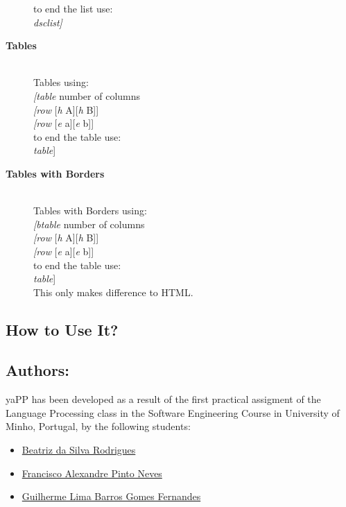 \documentclass{article}
\begin{document}
\begin{description}
to end the list use:\\
\textit{dsclist\textit{]}}
\item[\textbf{Tables}]\\
Tables using:\\
\textit{[table} number of columns\\
\textit{[row} [\textit{h} A][\textit{h} B]]\\
\textit{[row} [\textit{e} a][\textit{e} b]]\\
to end the table use:\\
\textit{table}]
\item[\textbf{Tables with Borders}]\\
Tables with Borders using:\\
\textit{[btable} number of columns\\
\textit{[row} [\textit{h} A][\textit{h} B]]\\
\textit{[row} [\textit{e} a][\textit{e} b]]\\
to end the table use:\\
\textit{table}]\\
This only makes difference to HTML.
\end{description}
 \subsection{How to Use It?}
 \subsection{Authors:}
yaPP has been developed as a result of the first practical assigment of the Language Processing class in the Software Engineering Course in University of Minho, Portugal, by the following students:\\
 
\begin{itemize}
\item \href{https://github.com/beasrodrigues24}{Beatriz da Silva Rodrigues}
\item \href{https://github.com/franl08}{Francisco Alexandre Pinto Neves}
\item \href{https://github.com/zer0-5}{Guilherme Lima Barros Gomes Fernandes}
\end{itemize}
\end{document}
